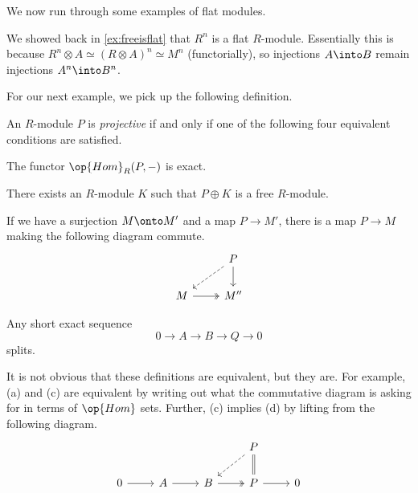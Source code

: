 We now run through some examples of flat modules.
\begin{example}
	We showed back in \autoref{ex:freeisflat} that $R^n$ is a flat $R$-module. Essentially this is because $R^n\otimes A\simeq(R\otimes A)^n\simeq M^n$ (functorially), so injections $A\into B$ remain injections $A^n\into B^n$.
\end{example}
For our next example, we pick up the following definition.
\begin{definition}[Projective]
	An $R$-module $P$ is \textit{projective} if and only if one of the following four equivalent conditions are satisfied.
	\begin{listalph}
		\item The functor $\op{Hom}_R(P,-)$ is exact.
		\item There exists an $R$-module $K$ such that $P\oplus K$ is a free $R$-module.
		\item If we have a surjection $M\onto M'$ and a map $P\to M'$, there is a map $P\to M$ making the following diagram commute.
		\[\begin{tikzcd}
			& P \\
			M & {M''}
			\arrow[from=1-2, to=2-2]
			\arrow[dashed, from=1-2, to=2-1]
			\arrow[two heads, from=2-1, to=2-2]
		\end{tikzcd}\]
		\item Any short exact sequence
		\[0\to A\to B\to Q\to 0\]
		splits.
	\end{listalph}
\end{definition}
It is not obvious that these definitions are equivalent, but they are. For example, (a) and (c) are equivalent by writing out what the commutative diagram is asking for in terms of $\op{Hom}$ sets. Further, (c) implies (d) by lifting from the following diagram.
\[\begin{tikzcd}
	&&& P \\
	0 & A & B & P & 0
	\arrow[Rightarrow, no head, from=1-4, to=2-4]
	\arrow[dashed, from=1-4, to=2-3]
	\arrow[two heads, from=2-3, to=2-4]
	\arrow[from=2-1, to=2-2]
	\arrow[from=2-2, to=2-3]
	\arrow[from=2-4, to=2-5]
\end{tikzcd}\]
